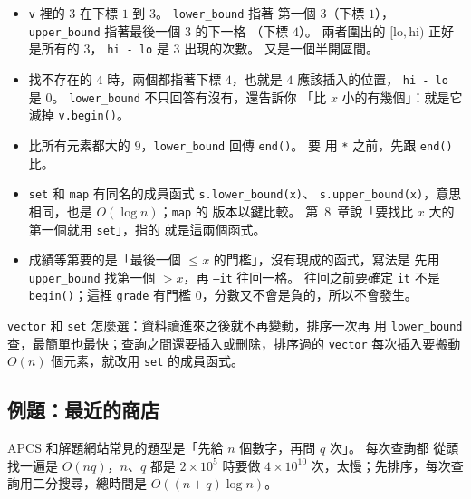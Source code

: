 
\begin{itemize}
\item \texttt{v} 裡的 $3$ 在下標 $1$ 到 $3$。 \texttt{lower\_bound} 指著
第一個 $3$（下標 $1$），\texttt{upper\_bound} 指著最後一個 $3$ 的下一格
（下標 $4$）。 兩者圍出的 $[\text{lo}, \text{hi})$ 正好是所有的 $3$，
\texttt{hi - lo} 是 $3$ 出現的次數。 又是一個半開區間。
\item 找不存在的 $4$ 時，兩個都指著下標 $4$，也就是 $4$ 應該插入的位置，
\texttt{hi - lo} 是 $0$。 \texttt{lower\_bound} 不只回答有沒有，還告訴你
「比 $x$ 小的有幾個」：就是它減掉 \texttt{v.begin()}。
\item 比所有元素都大的 $9$，\texttt{lower\_bound} 回傳 \texttt{end()}。 要
用 \texttt{*} 之前，先跟 \texttt{end()} 比。
\item \texttt{set} 和 \texttt{map} 有同名的成員函式 \texttt{s.lower\_bound(x)}、
\texttt{s.upper\_bound(x)}，意思相同，也是 $O(\log n)$；\texttt{map} 的
版本以鍵比較。 第~8~章說「要找比 $x$ 大的第一個就用 \texttt{set}」，指的
就是這兩個函式。
\item 成績等第要的是「最後一個 $\le x$ 的門檻」，沒有現成的函式，寫法是
先用 \texttt{upper\_bound} 找第一個 $> x$，再 \texttt{--it} 往回一格。
往回之前要確定 \texttt{it} 不是 \texttt{begin()}；這裡 \texttt{grade}
有門檻 $0$，分數又不會是負的，所以不會發生。
\end{itemize}

\texttt{vector} 和 \texttt{set} 怎麼選：資料讀進來之後就不再變動，排序一次再
用 \texttt{lower\_bound} 查，最簡單也最快；查詢之間還要插入或刪除，排序過的
\texttt{vector} 每次插入要搬動 $O(n)$ 個元素，就改用 \texttt{set} 的成員函式。

\subsection{例題：最近的商店}

APCS 和解題網站常見的題型是「先給 $n$ 個數字，再問 $q$ 次」。 每次查詢都
從頭找一遍是 $O(nq)$，$n$、$q$ 都是 $2 \times 10^5$ 時要做 $4 \times 10^{10}$
次，太慢；先排序，每次查詢用二分搜尋，總時間是 $O((n + q) \log n)$。

